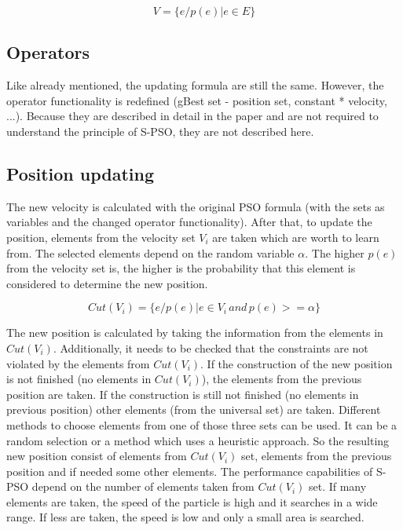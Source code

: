 \documentclass{article}
\begin{document}
\begin{equation}
V = \{e/p(e)| e \in E\}
\end{equation}

\subsection{Operators}
Like already mentioned, the updating formula are still the same. However, the operator functionality is redefined (gBest set - position set, constant * velocity, ...). Because they are described in detail in the paper and are not required to understand the principle of S-PSO, they are not described here.

\subsection{Position updating}
The new velocity is calculated with the original PSO formula (with the sets as variables and the changed operator functionality). After that, to update the position, elements from the velocity set $V_i$ are taken which are worth to learn from. The selected elements depend on the random variable $\alpha$. The higher $p(e)$ from the velocity set is, the higher is the probability that this element is considered to determine the new position.

\begin{equation}
Cut(V_i) = \{e/p(e)| e \in V_i \, and \, p(e) >= \alpha\}
\end{equation}

The new position is calculated by taking the information from the elements in $Cut(V_i)$. Additionally, it needs to be checked that the constraints are not violated by the elements from $Cut(V_i)$. If the construction of the new position is not finished (no elements in $Cut(V_i)$), the elements from the previous position are taken. If the construction is still not finished (no elements in previous position) other elements (from the universal set) are taken. Different methods to choose elements from one of those three sets can be used. It can be a random selection or a method which uses a heuristic approach. So the resulting new position consist of elements from $Cut(V_i)$ set, elements from the previous position and if needed some other elements. The performance capabilities of S-PSO depend on the number of elements taken from $Cut(V_i)$ set. If many elements are taken, the speed of the particle is high and it searches in a wide range. If less are taken, the speed is low and only a small area is searched.
\end{document}
